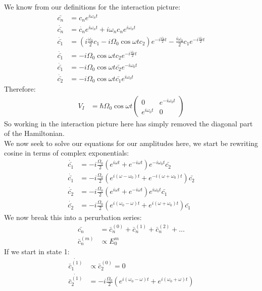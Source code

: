 We know from our definitions for the interaction picture:
\begin{align*}
	\bar{c_n} &= c_n e^{i\omega_n t} \\
	\dot{\bar{c_n}} &= \dot{c_n} e^{i\omega_n t} + i\omega_n c_n e^{i\omega_n t} \\
	\dot{\bar{c_1}} &= \left(i \frac{\omega_0}{2} c_1 - i\Omega_0\cos\omega t c_2 \right) e^{-i\frac{\omega_0}{2} t} -\frac{i\omega_0}{2}c_1 e^{-i\frac{\omega_0}{2} t} \\
	\dot{\bar{c_1}} &= - i\Omega_0\cos\omega t c_2  e^{-i\frac{\omega_0}{2} t} \\
	\dot{\bar{c_1}} &= -i\Omega_0\cos\omega t \bar{c_2}e^{-i\omega_0 t} \\
	\dot{\bar{c_2}} &= -i\Omega_0\cos\omega t \bar{c_1} e^{i\omega_0 t}
\end{align*}
Therefore:
\begin{align*}
	V_I &= \hbar \Omega_0 \cos\omega t \begin{pmatrix}
		0 & e^{-i\omega_0 t} \\
		e^{i\omega_0 t} & 0
		\end{pmatrix}
\end{align*}
So working in the interaction picture here has simply removed the diagonal part of the Hamiltonian. \\
We now seek to solve our equations for our amplitudes here, we start be rewriting cosine in terms of complex exponentials:
\begin{align*}
	\dot{\bar{c_1}} &= -i\frac{\Omega_0}{2}\left(e^{i\omega t} + e^{-i\omega t}\right)e^{-i\omega_0 t}\bar{c_2} \\
	\dot{\bar{c_1}} &= -i\frac{\Omega_0}{2}\left(e^{i(\omega-\omega_0) t} + e^{-i(\omega+\omega_0) t}\right)\bar{c_2} \\
	\dot{\bar{c_2}} &= -i\frac{\Omega_0}{2}\left(e^{i\omega t} + e^{-i\omega t}\right)e^{i\omega_0 t}\bar{c_1} \\
	\dot{\bar{c_2}} &= -i\frac{\Omega_0}{2}\left(e^{i(\omega_0-\omega) t} + e^{i(\omega + \omega_0)t}\right)\bar{c_1}
\end{align*}
We now break this into a perurbation series:
\begin{align*}
	\bar{c_n} &= \bar{c}_n^{(0)} + \bar{c}_n^{(1)} +\bar{c}_n^{(2)} + \ldots \\
	\bar{c}_n^{(m)} &\propto E_0^m 
\end{align*}
If we start in state 1:
\begin{align*}
	\dot{\bar{c}_1^{(1)}} &\propto \bar{c}_2^{(0)} = 0 \\
	\dot{\bar{c}_2^{(1)}} &=-i\frac{\Omega_0}{2}\left(e^{i(\omega_0 - \omega) t} + e^{i(\omega_0 + \omega)t}\right)
\end{align*}
